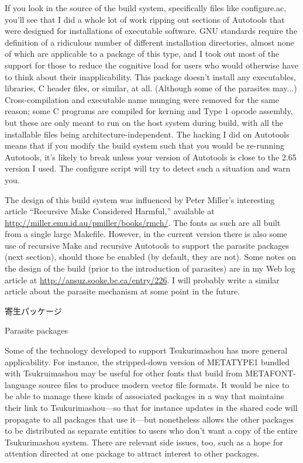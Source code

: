 \documentclass[14pt]{extarticle}
\newcommand{\blsubsection}[2]{%
\kaku\large#1\qquad\phantomsection%
\addcontentsline{toc}{subsection}{#1 #2}%
#2\par\addpenalty{-300}\normalsize}
\begin{document}
If you look in the source of the build system, specifically files like
configure.ac, you'll see that I did a whole lot of work ripping out sections
of Autotools that were designed for installations of executable software. 
GNU standards require the definition of a ridiculous number of different
installation directories, almost none of which are applicable to a package
of this type, and I took out most of the support for those to reduce the
cognitive load for users who would otherwise have to think about their
inapplicability.  This package doesn't install any executables, libraries, C
header files, or similar, at all.  (Although some of the parasites may...)
Cross-compilation and executable name munging were removed for the same
reason; some C programs are compiled for kerning and Type 1 opcode assembly,
but these are only meant to run on the host system during build, with all
the installable files being architecture-independent.  The hacking I did on
Autotools means that if you modify the build system such that you would be
re-running Autotools, it's likely to break unless your version of Autotools
is close to the 2.65 version I used.  The configure script will try to
detect such a situation and warn you.

The design of this build system was influenced by Peter Miller's interesting
article ``Recursive Make Considered Harmful,'' available at
\url{http://miller.emu.id.au/pmiller/books/rmch/}.  The fonts as such are
all built from a single large Makefile.  However, in the current version
there is also some use of recursive Make and recursive Autotools to support
the parasite packages (next section), should those be enabled (by default,
they are not).  Some notes on the design of the build (prior to the
introduction of parasites) are in my Web log article at
\url{http://ansuz.sooke.bc.ca/entry/226}.  I will probably write a similar
article about the parasite mechanism at some point in the future.


\blsubsection{寄生パッケージ}{Parasite packages}\label{sub:parasites}

Some of the technology developed to support Tsukurimashou has more general
applicability.  For instance, the stripped-down version of METATYPE1 bundled
with Tsukruimashou may be useful for other fonts that build from
METAFONT-language source files to produce modern vector file formats.  It
would be nice to be able to manage these kinds of associated packages in a
way that maintains their link to Tsukurimashou---so that for instance
updates in the shared code will propagate to all packages that use it---but
nonetheless allows the other packages to be distributed as separate entities
to users who don't want a copy of the entire Tsukurimashou system.  There
are relevant side issues, too, such as a hope for attention directed at one
package to attract interest to other packages.
\end{document}
